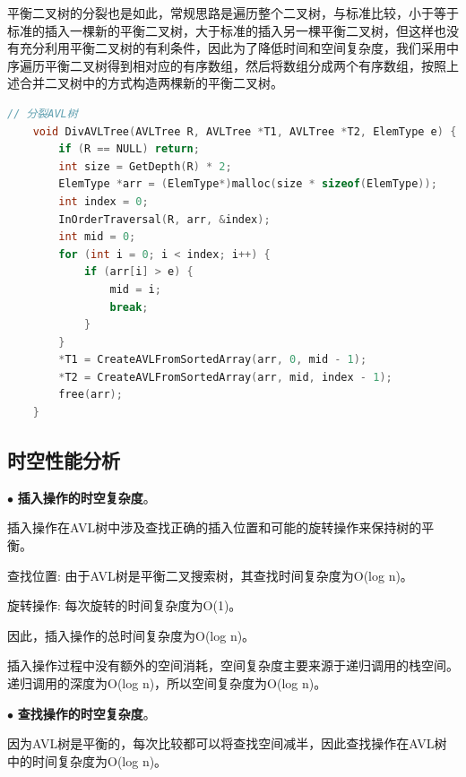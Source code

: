 平衡二叉树的分裂也是如此，常规思路是遍历整个二叉树，与标准比较，小于等于标准的插入一棵新的平衡二叉树，大于标准的插入另一棵平衡二叉树，但这样也没有充分利用平衡二叉树的有利条件，因此为了降低时间和空间复杂度，我们采用中序遍历平衡二叉树得到相对应的有序数组，然后将数组分成两个有序数组，按照上述合并二叉树中的方式构造两棵新的平衡二叉树。


\begin{lstlisting}[language=C, caption={平衡二叉树的分裂}]
    // 分裂AVL树
    void DivAVLTree(AVLTree R, AVLTree *T1, AVLTree *T2, ElemType e) {
        if (R == NULL) return;
        int size = GetDepth(R) * 2;
        ElemType *arr = (ElemType*)malloc(size * sizeof(ElemType));
        int index = 0;
        InOrderTraversal(R, arr, &index);
        int mid = 0;
        for (int i = 0; i < index; i++) {
            if (arr[i] > e) {
                mid = i;
                break;
            }
        }
        *T1 = CreateAVLFromSortedArray(arr, 0, mid - 1);
        *T2 = CreateAVLFromSortedArray(arr, mid, index - 1);
        free(arr);
    }
\end{lstlisting}

\subsection{时空性能分析}

\noindent
$\bullet$
\textbf{插入操作的时空复杂度}。

插入操作在AVL树中涉及查找正确的插入位置和可能的旋转操作来保持树的平衡。

查找位置: 由于AVL树是平衡二叉搜索树，其查找时间复杂度为O(log n)。

旋转操作: 每次旋转的时间复杂度为O(1)。

因此，插入操作的总时间复杂度为O(log n)。

插入操作过程中没有额外的空间消耗，空间复杂度主要来源于递归调用的栈空间。递归调用的深度为O(log n)，所以空间复杂度为O(log n)。

\vspace{1ex}

\noindent
$\bullet$
\textbf{查找操作的时空复杂度}。

因为AVL树是平衡的，每次比较都可以将查找空间减半，因此查找操作在AVL树中的时间复杂度为O(log n)。

